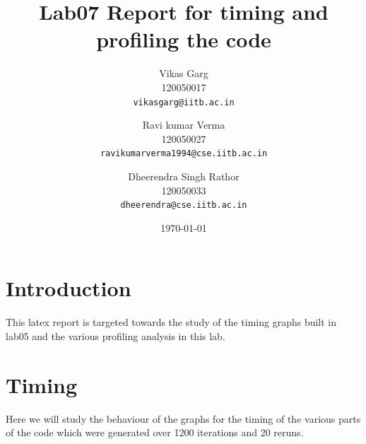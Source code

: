 \documentclass[11pt]{article}
\begin{document}
\title{\vspace{15ex}\Huge{Lab07 Report for timing and profiling the code}\vspace{15ex}}


\author{
  Vikas Garg\\120050017\\
  \texttt{vikasgarg@iitb.ac.in}\\[1 cm]
  \and
  Ravi kumar Verma\\120050027\\
  \texttt{ravikumarverma1994@cse.iitb.ac.in}
  \and 
  Dheerendra Singh Rathor\\120050033\\
  \texttt{dheerendra@cse.iitb.ac.in}\\[1 cm]
}

\date{\today}
\maketitle
\newpage
\section{Introduction}
This latex report is targeted towards the study of the timing graphs built in lab05 and the various profiling analysis in this lab.

\section{Timing}
Here we will study the behaviour of the graphs for the timing of the various parts of the code which were generated over 1200 iterations and 20 reruns.
\end{document}
